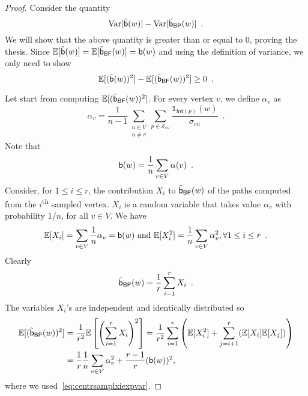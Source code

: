 \begin{proof}
  Consider the quantity
  \[
  \mathrm{Var}[\tilde{\mathsf{b}}(w)]-\mathrm{Var}[\tilde{\mathsf{b}}_\mathsf{BP}(w)]\enspace.\]
  We will show that the above quantity is greater than or equal to 0, proving
  the thesis.
  Since
  $\mathbb{E}[\tilde{\mathsf{b}}(w)]=\mathbb{E}[\tilde{\mathsf{b}}_\mathsf{BF}(w)]=\mathsf{b}(w)$
  and using the definition of variance, we only need to show 
  \begin{equation}\label{eq:centrsamplinequal}
    \mathbb{E}[(\tilde{\mathsf{b}}(w))^2]-\mathbb{E}[(\tilde{\mathsf{b}}_\mathsf{BF}(w))^2]\ge
    0\enspace.
  \end{equation}

  Let start from computing $\mathbb{E}[(\tilde{\mathsf{b}}_\mathsf{BF}(w))^2]$. For every
  vertex $v$, we define $\alpha_v$ as
  \[
  \alpha_v=\frac{1}{n-1}\sum_{\substack{u\in V
  \\u\neq
  v}}\sum_{p\in\mathcal{S}_{vu}}\frac{\mathds{1}_{\mathsf{Int}(p)}(w)}{\sigma_{vu}}\enspace.
  \]
  Note that 
  \begin{equation}\label{eq:centrsamplbetwalpha}
    \mathsf{b}(w)=\frac{1}{n}\sum_{v\in V}\alpha(v)\enspace.
  \end{equation}
  Consider, for $1\le i \le r$, the contribution $X_i$ to $\tilde{\mathsf{b}}_\mathsf{BP}(w)$
  of the paths computed from the $i$\textsuperscript{th} sampled vertex. $X_i$
  is a random variable that takes value $\alpha_v$ with probability $1/n$, for
  all $v\in V$. We have
  \begin{equation}\label{eq:centrsamplxiexpvar}
    \mathbb{E}[X_i]=\sum_{v\in V}\frac{1}{n}\alpha_v=\mathsf{b}(w) \mbox{ and }
    \mathbb{E}[X_i^2]=\frac{1}{n}\sum_{v\in V}\alpha_v^2, \forall 1\le i\le r\enspace.
  \end{equation}
  Clearly
  \[
  \tilde{\mathsf{b}}_\mathsf{BP}(w)=\frac{1}{r}\sum_{i=1}^r X_i\enspace.
  \]
  The variables $X_i$'s are independent and identically distributed so
  \begin{align}\label{eq:centrsamplexpxisquared}
    \mathbb{E}[(\tilde{\mathsf{b}}_\mathsf{BP}(w))^2]&=\frac{1}{r^2}\mathbb{E}\left[\left(\sum_{i=1}^rX_i\right)^2\right]=\frac{1}{r^2}\sum_{i=1}^r\left(\mathbb{E}[X_i^2]+\sum_{j=i+1}^r(\mathbb{E}[X_i]\mathbb{E}[X_j])\right)
    \nonumber\\
    &=\frac{1}{r}\frac{1}{n}\sum_{v\in V}\alpha_v^2+\frac{r-1}{r}(\mathsf{b}(w))^2,
\end{align}
where we used~\eqref{eq:centrsamplxiexpvar}.


\end{proof}
